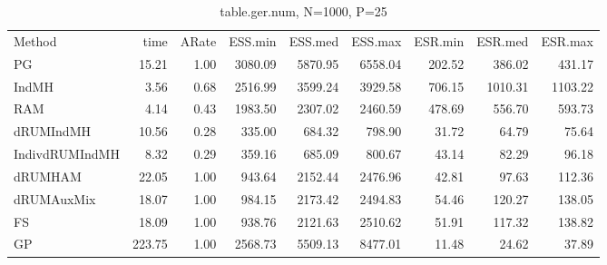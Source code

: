 \begin{table}
\begin{tabular}{l r r r r r r r r } 
          Method  &     time &    ARate &  ESS.min &  ESS.med &  ESS.max &  ESR.min &  ESR.med &  ESR.max \\ 
              PG  &    15.21 &     1.00 &  3080.09 &  5870.95 &  6558.04 &   202.52 &   386.02 &   431.17 \\ 
           IndMH  &     3.56 &     0.68 &  2516.99 &  3599.24 &  3929.58 &   706.15 &  1010.31 &  1103.22 \\ 
             RAM  &     4.14 &     0.43 &  1983.50 &  2307.02 &  2460.59 &   478.69 &   556.70 &   593.73 \\ 
       dRUMIndMH  &    10.56 &     0.28 &   335.00 &   684.32 &   798.90 &    31.72 &    64.79 &    75.64 \\ 
  IndivdRUMIndMH  &     8.32 &     0.29 &   359.16 &   685.09 &   800.67 &    43.14 &    82.29 &    96.18 \\ 
         dRUMHAM  &    22.05 &     1.00 &   943.64 &  2152.44 &  2476.96 &    42.81 &    97.63 &   112.36 \\ 
      dRUMAuxMix  &    18.07 &     1.00 &   984.15 &  2173.42 &  2494.83 &    54.46 &   120.27 &   138.05 \\ 
              FS  &    18.09 &     1.00 &   938.76 &  2121.63 &  2510.62 &    51.91 &   117.32 &   138.82 \\ 
              GP  &   223.75 &     1.00 &  2568.73 &  5509.13 &  8477.01 &    11.48 &    24.62 &    37.89
 \end{tabular}
\caption{table.ger.num, N=1000, P=25}
\end{table}

